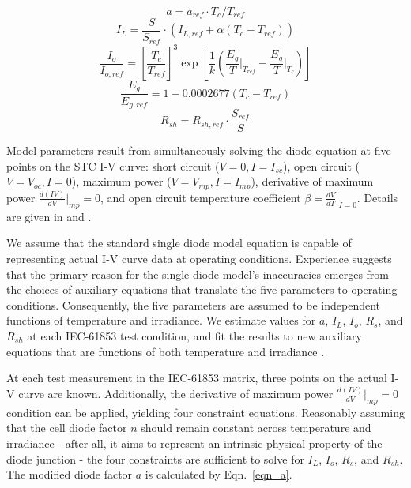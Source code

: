 \documentclass[12pt,letterpaper]{article}
\begin{document}
\begin{equation}\label{eqn_aux1} a = a_{ref}\cdot T_c / T_{ref} \end{equation}
\begin{equation}\label{eqn_aux2} I_L = \frac{S}{S_{ref}}\cdot(I_{L,ref} + \alpha(T_c-T_{ref})) \end{equation}
\begin{equation}\label{eqn_aux3}
\frac{I_o}{I_{o,ref}} = \left[ \frac{T_{c}}{T_{ref}} \right] ^ 3 \exp \left[ \frac{1}{k} \left( \frac{E_g}{T}\Bigg|_{T_{ref}} - \frac{E_g}{T}\Bigg|_{T_{c}} \right) \right]
\end{equation}
\begin{equation}\label{eqn_aux4}
\frac{E_g}{E_{g,ref}} = 1 - 0.0002677(T_{c} - T_{ref})
\end{equation}
\begin{equation}\label{eqn_aux5}
R_{sh} = R_{sh,ref}\cdot\frac{S_{ref}}{S}
\end{equation}

Model parameters result from simultaneously solving the diode equation at five points on the STC I-V curve: short circuit ($V=0, I=I_{sc}$), open circuit ($V=V_{oc}, I=0$), maximum power ($V=V_{mp}, I=I_{mp}$), derivative of maximum power $\frac{d(IV)}{dV}|_{mp}=0$, and open circuit temperature coefficient $\beta = \frac{dV}{dT}|_{I=0}$.  Details are given in \cite{desoto2004a} and \cite{dobos2012a}.

We assume that the standard single diode model equation is capable of representing actual I-V curve data at operating conditions.  Experience suggests that the primary reason for the single diode model's inaccuracies emerges from the choices of auxiliary equations that translate the five parameters to operating conditions.  Consequently, the five parameters are assumed to be independent functions of temperature and irradiance.  We estimate values for $a$, $I_L$, $I_o$, $R_s$, and $R_{sh}$ at each IEC-61853 test condition, and fit the results to new auxiliary equations that are functions of both temperature and irradiance .

At each test measurement in the IEC-61853 matrix, three points on the actual I-V curve are known.  Additionally, the derivative of maximum power $\frac{d(IV)}{dV}|_{mp}=0$ condition can be applied, yielding four constraint equations.  Reasonably assuming that the cell diode factor $n$ should remain constant across temperature and irradiance - after all, it aims to represent an intrinsic physical property of the diode junction - the four constraints are sufficient to solve for $I_L$, $I_o$, $R_s$, and $R_{sh}$.  The modified diode factor $a$ is calculated by Eqn.~\ref{eqn_a}.
\end{document}
